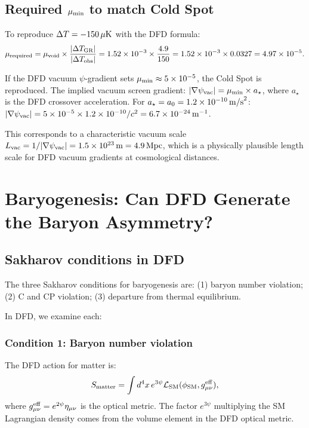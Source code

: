 \documentclass[11pt]{article}
\newcommand{\ee}[1]{\times 10^{#1}}
\newcommand{\mufd}{\mu}
\begin{document}
\subsection{Required $\mufd_{\rm min}$ to match Cold Spot}

To reproduce $\Delta T = -150\,\mu{\rm K}$ with the DFD formula:
\begin{equation}
  \mufd_{\rm required} = \mufd_{\rm void}\times\frac{|\Delta T_{\rm GR}|}{|\Delta T_{\rm obs}|}
  = 1.52\ee{-3}\times\frac{4.9}{150} = 1.52\ee{-3}\times 0.0327 = 4.97\ee{-5}.
\end{equation}

If the DFD vacuum $\psi$-gradient sets $\mufd_{\rm min} \approx 5\ee{-5}$,
the Cold Spot is reproduced.  The implied vacuum screen gradient:
$|\nabla\psi_{\rm vac}| = \mufd_{\rm min}\times a_\star$, where $a_\star$
is the DFD crossover acceleration.  For $a_\star = a_0 = 1.2\ee{-10}\,{\rm m/s}^2$:
$|\nabla\psi_{\rm vac}| = 5\ee{-5}\times 1.2\ee{-10}/c^2 = 6.7\ee{-24}\,{\rm m}^{-1}$.

This corresponds to a characteristic vacuum scale $L_{\rm vac} = 1/|\nabla\psi_{\rm vac}|
= 1.5\ee{23}\,{\rm m} = 4.9\,{\rm Mpc}$, which is a physically plausible
length scale for DFD vacuum gradients at cosmological distances.

\section{Baryogenesis: Can DFD Generate the Baryon Asymmetry?}
\label{sec:baryogenesis}

\subsection{Sakharov conditions in DFD}

The three Sakharov conditions for baryogenesis are: (1) baryon number
violation; (2) C and CP violation; (3) departure from thermal equilibrium.

In DFD, we examine each:

\subsubsection{Condition 1: Baryon number violation}

The DFD action for matter is:
\begin{equation}
  S_{\rm matter} = \int d^4x\,e^{3\psi}\mathcal{L}_{\rm SM}(\phi_{\rm SM}, g_{\mu\nu}^{\rm eff}),
\end{equation}
where $g_{\mu\nu}^{\rm eff} = e^{2\psi}\eta_{\mu\nu}$ is the optical metric.
The factor $e^{3\psi}$ multiplying the SM Lagrangian density comes from the
volume element in the DFD optical metric.
\end{document}
